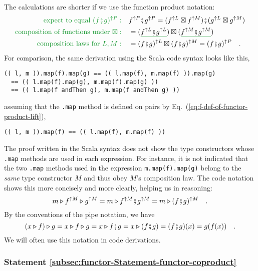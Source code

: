 The calculations are shorter if we use the function product notation:
\begin{align*}
{\color{greenunder}\text{expect to equal }(f\bef g)^{\uparrow P}:}\quad & f^{\uparrow P}\bef g^{\uparrow P}=(f^{\uparrow L}\boxtimes f^{\uparrow M})\bef(g^{\uparrow L}\boxtimes g^{\uparrow M})\\
{\color{greenunder}\text{composition of functions under }\boxtimes:}\quad & =(\gunderline{f^{\uparrow L}\bef g^{\uparrow L}})\boxtimes(\gunderline{f^{\uparrow M}\bef g^{\uparrow M}})\\
{\color{greenunder}\text{composition laws for }L,M:}\quad & =(f\bef g)^{\uparrow L}\boxtimes(f\bef g)^{\uparrow M}=(f\bef g)^{\uparrow P}\quad.
\end{align*}
For comparison, the same derivation using the Scala code syntax looks
like this,
\begin{lstlisting}
(( l, m )).map(f).map(g) == (( l.map(f), m.map(f) )).map(g)
  == (( l.map(f).map(g), m.map(f).map(g) ))
  == (( l.map(f andThen g), m.map(f andThen g) )) 
\end{lstlisting}
assuming that the \lstinline!.map! method is defined on pairs by
Eq.~(\ref{eq:f-def-of-functor-product-lift}),
\begin{lstlisting}
(( l, m )).map(f) == (( l.map(f), m.map(f) ))
\end{lstlisting}
The proof written in the Scala syntax does not show the type constructors
whose \lstinline!.map! methods are used in each expression. For instance,
it is not indicated that the two \lstinline!.map! methods used in
the expression \lstinline!m.map(f).map(g)! belong to the \emph{same}
type constructor $M$ and thus obey $M$'s composition law. The code
notation shows this more concisely and more clearly, helping us in
reasoning:
\[
m\triangleright f^{\uparrow M}\triangleright g^{\uparrow M}=m\triangleright f^{\uparrow M}\bef g^{\uparrow M}=m\triangleright(f\bef g)^{\uparrow M}\quad.
\]
By the conventions of the pipe notation, we have
\[
\left(x\triangleright f\right)\triangleright g=x\triangleright f\triangleright g=x\triangleright f\bef g=x\triangleright(f\bef g)=(f\bef g)(x)=g(f(x))\quad.
\]
We will often use this notation in code derivations.

\subsubsection{Statement \label{subsec:functor-Statement-functor-coproduct}\ref{subsec:functor-Statement-functor-coproduct}}

